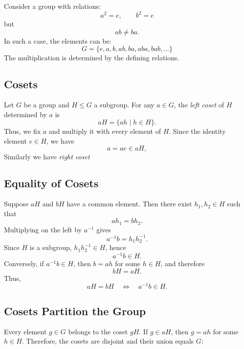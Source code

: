 \documentclass[a4paper,12pt]{article}
\theoremstyle{definition}
\begin{document}
Consider a group with relations:
\[
a^2 = e, \qquad b^2 = e
\]
but
\[
ab \neq ba.
\]
In such a case, the elements can be:
\[
G = \{ e, a, b, ab, ba, aba, bab, \dots \}
\]
The multiplication is determined by the defining relations.

\subsection{Cosets}
Let $G$ be a group and $H \leq G$ a subgroup. For any $a \in G$, the \textit{left coset} of $H$ determined by $a$ is
\begin{equation*}
aH = \{ ah \mid h \in H \}.
\end{equation*}
Thus, we fix $a$ and multiply it with every element of $H$. Since the identity element $e \in H$, we have
\begin{equation*}
a = ae \in aH,
\end{equation*}
Similarly we have \emph{right coset}

\subsection{Equality of Cosets}

Suppose $aH$ and $bH$ have a common element. Then there exist $h_1, h_2 \in H$ such that
\begin{equation*}
ah_1 = bh_2.
\end{equation*}
Multiplying on the left by $a^{-1}$ gives
\begin{equation*}
a^{-1}b = h_1 h_2^{-1}.
\end{equation*}
Since $H$ is a subgroup, $h_1 h_2^{-1} \in H$, hence
\begin{equation*}
a^{-1}b \in H.
\end{equation*}
Conversely, if $a^{-1}b \in H$, then $b = ah$ for some $h \in H$, and therefore
\begin{equation*}
bH = aH.
\end{equation*}
Thus,
\begin{equation*}
aH = bH \quad \Longleftrightarrow \quad a^{-1}b \in H.
\end{equation*}

\subsection{Cosets Partition the Group}

Every element $g \in G$ belongs to the coset $gH$. If $g \in aH$, then $g = ah$ for some $h \in H$. Therefore, the cosets are disjoint and their union equals $G$:
\end{document}
